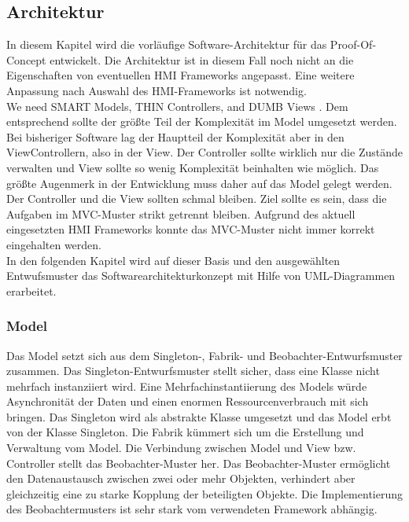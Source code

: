 \subsection{Architektur}

In diesem Kapitel wird die vorläufige Software-Architektur für das Proof-Of-Concept entwickelt. Die Architektur ist in diesem Fall noch nicht an die Eigenschaften von eventuellen \ac{HMI} Frameworks angepasst. Eine weitere Anpassung nach Auswahl des \ac{HMI}-Frameworks ist notwendig.\\

\glqq{}We need SMART Models, THIN Controllers, and DUMB Views\grqq{} \cite{mvc_wiki}. Dem entsprechend sollte der größte Teil der Komplexität im Model umgesetzt werden. Bei bisheriger Software lag der Hauptteil der Komplexität aber in den ViewControllern, also in der View. Der Controller sollte wirklich nur die Zustände verwalten und View sollte so wenig Komplexität beinhalten wie möglich. Das größte Augenmerk in der Entwicklung muss daher auf das Model gelegt werden. Der Controller und die View sollten schmal bleiben. Ziel sollte es sein, dass die Aufgaben im MVC-Muster strikt getrennt bleiben. Aufgrund des aktuell eingesetzten \ac{HMI} Frameworks konnte das \ac{MVC}-Muster nicht immer korrekt eingehalten werden.\\

In den folgenden Kapitel wird auf dieser Basis und den ausgewählten Entwufsmuster das Softwarearchitekturkonzept mit Hilfe von UML-Diagrammen erarbeitet.\\

\subsubsection{Model}
Das Model setzt sich aus dem Singleton-, Fabrik- und Beobachter-Entwurfsmuster zusammen. Das Singleton-Entwurfsmuster stellt sicher, dass eine Klasse nicht mehrfach instanziiert wird. Eine Mehrfachinstantiierung des Models würde Asynchronität der Daten und einen enormen Ressourcenverbrauch mit sich bringen. Das Singleton wird als abstrakte Klasse umgesetzt und das Model erbt von der Klasse Singleton. Die Fabrik kümmert sich um die Erstellung und Verwaltung vom Model. Die Verbindung zwischen Model und View bzw. Controller stellt das Beobachter-Muster her. Das Beobachter-Muster ermöglicht den Datenaustausch zwischen zwei oder mehr Objekten, verhindert aber gleichzeitig eine zu starke Kopplung der beteiligten Objekte. Die Implementierung des Beobachtermusters ist sehr stark vom verwendeten Framework abhängig.\\


